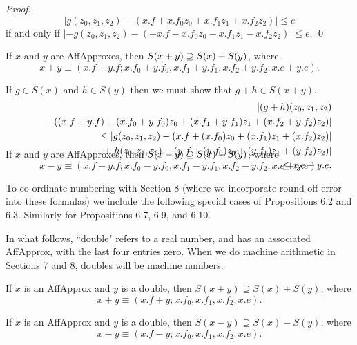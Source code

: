 {\it Proof}.
$$|g(z_0,z_1,z_2) - (x.f + x.f_0 z_0 + x.f_1 z_1 + x.f_2 z_2)| \le e$$
if and only if 
\hfill $|-g(z_0,z_1,z_2) - (-x.f - x.f_0 z_0 - x.f_1 z_1 - x.f_2 z_2)| \le e.$ \hfill\qed


 \hskip-8pt If $x$ and $y$ are {\rm AffApproxes,} then $S(x + y)\break \supseteq S(x)
+ S(y)${\rm ,} where
$$x + y \equiv (x.f + y.f; x.f_0 + y.f_0, x.f_1 + y.f_1, x.f_2 + y.f_2; x.e + y.e).$$
\endproclaim  

  If $g\in S(x)$ and $h \in S(y)$ then we must show that $g + h \in S(x + y).$
\begin{eqnarray*}
&&|(g + h)(z_0,z_1,z_2) \\
&&\quad- ((x.f + y.f) + (x.f_0 + y.f_0) z_0 + (x.f_1 + y.f_1) z_1 + (x.f_2 + y.f_2) z_2)| \\
&&\qquad 
\le |g(z_0,z_1,z_2) - 
(x.f + (x.f_0) z_0 + (x.f_1) z_1 + (x.f_2) z_2)| \\
&&\quad\qquad + 
|h(z_0,z_1,z_2) - (y.f + (y.f_0) z_0 + (y.f_1) z_1 + (y.f_2) z_2)| 
                                        \\
&&\qquad \le x.e + y.e.\\
\noalign{\vskip-36pt}
\end{eqnarray*}
\enddemo

 \hskip-8pt If $x$ and $y$ are {\rm AffApproxes,} then $S(x - y)\break \supseteq
S(x) - S(y)${\rm ,}
 where
$$x - y \equiv (x.f - y.f; x.f_0 - y.f_0, x.f_1 - y.f_1, x.f_2 - y.f_2; x.e + y.e).$$ 
\endproclaim

To co-ordinate numbering with Section 8 (where we incorporate round-off error into these formulas) we include the following special
cases of Propositions 6.2 and 6.3.  Similarly for Propositions 6.7, 6.9, and 6.10. 

In what follows,  ``double" refers to a real number, and has an associated AffApprox, with the last four entries zero.  When we do
machine arithmetic in Sections 7 and 8, doubles will be  machine numbers.

 If $x$ is an {\rm AffApprox}  and $y$ is a double{\rm ,}
 then $S(x +
y)
\supseteq S(x) + S(y)${\rm ,} where
$$x + y \equiv (x.f + y; x.f_0, x.f_1 , x.f_2 ; x.e).$$ 
\endproclaim

  If $x$ is an {\rm AffApprox} and $y$ is a double{\rm ,}
 then
$S(x - y)
\supseteq S(x) - S(y)${\rm ,} where
$$x - y \equiv (x.f - y; x.f_0, x.f_1 , x.f_2 ; x.e).$$ 
\endproclaim

